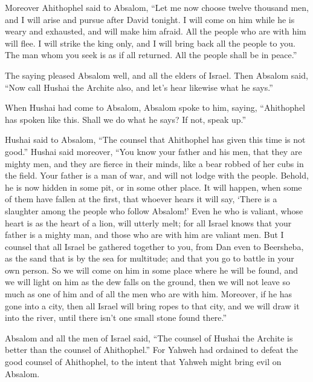  Moreover Ahithophel said to Absalom, ``Let me now choose
twelve thousand men, and I will arise and pursue after David tonight.
 I will come on him while he is weary and exhausted, and
will make him afraid. All the people who are with him will flee. I will
strike the king only,  and I will bring back all the
people to you. The man whom you seek is as if all returned. All the
people shall be in peace.''

 The saying pleased Absalom well, and all the elders of
Israel.  Then Absalom said, ``Now call Hushai the Archite
also, and let's hear likewise what he says.''

 When Hushai had come to Absalom, Absalom spoke to him,
saying, ``Ahithophel has spoken like this. Shall we do what he says? If
not, speak up.''

 Hushai said to Absalom, ``The counsel that Ahithophel has
given this time is not good.''  Hushai said moreover,
``You know your father and his men, that they are mighty men, and they
are fierce in their minds, like a bear robbed of her cubs in the field.
Your father is a man of war, and will not lodge with the people.
 Behold, he is now hidden in some pit, or in some other
place. It will happen, when some of them have fallen at the first, that
whoever hears it will say, `There is a slaughter among the people who
follow Absalom!'  Even he who is valiant, whose heart is
as the heart of a lion, will utterly melt; for all Israel knows that
your father is a mighty man, and those who are with him are valiant men.
 But I counsel that all Israel be gathered together to
you, from Dan even to Beersheba, as the sand that is by the sea for
multitude; and that you go to battle in your own person. 
So we will come on him in some place where he will be found, and we will
light on him as the dew falls on the ground, then we will not leave so
much as one of him and of all the men who are with him. 
Moreover, if he has gone into a city, then all Israel will bring ropes
to that city, and we will draw it into the river, until there isn't one
small stone found there.''

 Absalom and all the men of Israel said, ``The counsel of
Hushai the Archite is better than the counsel of Ahithophel.'' For
Yahweh had ordained to defeat the good counsel of Ahithophel, to the
intent that Yahweh might bring evil on Absalom.

